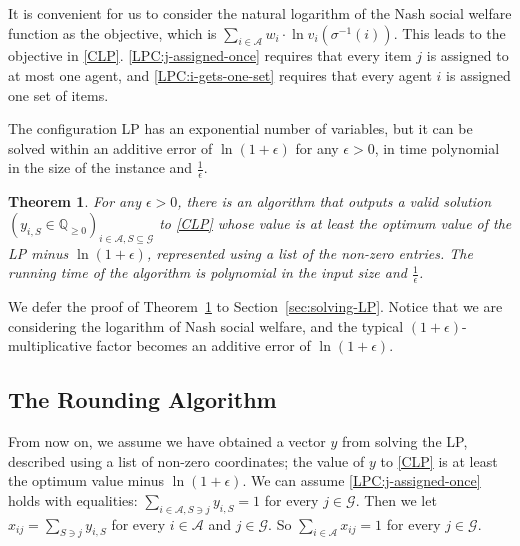 \documentclass[10pt,a4paper]{article}
\newtheorem{theorem}{Theorem}[section]
\theoremstyle{definition}
\theoremstyle{plain}
\newcommand\calA{{\mathcal{A}}}
\newcommand\calG{{\mathcal{G}}}
\newcommand{\Q}{{\mathbb{Q}}}
\begin{document}
It is convenient for us to consider the natural logarithm of the Nash social welfare function as the objective, which is $\sum_{i \in \calA} w_i \cdot \ln v_i (\sigma^{-1}(i))$. This leads to the objective in \eqref{CLP}.  \eqref{LPC:j-assigned-once} requires that every item $j$ is assigned to at most one agent, and \eqref{LPC:i-gets-one-set} requires that every agent $i$ is assigned one set of items. 

The configuration LP has an exponential number of variables, but it can be solved within an additive error of $\ln(1 + \epsilon)$ for any $\epsilon > 0$, in time polynomial in the size of the instance  and $\frac1\epsilon$. 
\begin{theorem}
    \label{thm:solve-lp}
    For any $\epsilon > 0$, there is an algorithm that     
    outputs a valid solution $(y_{i, S} \in \Q_{\geq 0})_{i \in \calA, S \subseteq \calG}$ to \eqref{CLP} whose value is at least the optimum value of the LP minus $\ln(1+\epsilon)$, represented using a list of the non-zero entries. The running time of the algorithm is polynomial in the input size and $\frac1\epsilon$.
\end{theorem}
We defer the proof of Theorem~\ref{thm:solve-lp} to Section~\ref{sec:solving-LP}. 
Notice that we are considering the logarithm of Nash social welfare, and the typical $(1+\epsilon)$-multiplicative factor becomes an additive error of $\ln(1 + \epsilon)$. 


\subsection{The Rounding Algorithm} \label{sec:rounding}
    From now on, we assume we have obtained a vector $y$ from solving the LP, described using a list of non-zero coordinates; the value of $y$ to \eqref{CLP} is at least the optimum value minus $\ln(1+\epsilon)$. We can assume \eqref{LPC:j-assigned-once} holds with equalities: $\sum_{i \in \calA, S \ni j}y_{i, S} = 1$ for every $j \in \calG$. Then we let $x_{ij} = \sum_{S \ni j} y_{i, S}$ for every $i \in \calA$ and $j \in \calG$. So $\sum_{i \in \calA} x_{ij} = 1$ for every $j \in \calG$.
\end{document}
